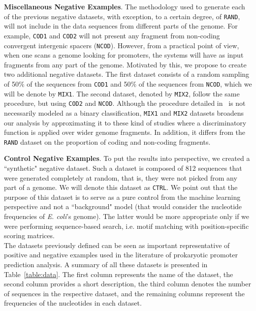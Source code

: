 \documentclass[conference]{IEEEtran}
\begin{document}
\noindent
{\bf Miscellaneous Negative Examples}. The methodology used to generate each of the previous negative datasets, with exception, to a certain degree, of {\tt RAND}, will not include in the data sequences from different parts of the genome. For example, {\tt COD1} and {\tt COD2} will not present any fragment from  non-coding convergent intergenic spacers ({\tt NCOD}). However, from a practical point of view, when one scans a genome looking for promoters, the systems will have as input fragments from any part of the genome. Motivated by this, we propose to create two additional negative datasets. The first dataset consists of a random sampling of 50\% of the sequences from {\tt COD1} and 50\% of the sequences from {\tt NCOD}, which we will be denote by {\tt MIX1}. The second dataset, denoted by {\tt MIX2}, follow the same procedure, but using {\tt COD2} and {\tt NCOD}. Although the procedure detailed in~\cite{hutchinson1996} is not necessarily modeled as a binary classification, {\tt MIX1} and {\tt MIX2} datasets broadens our analysis by approximating it to these kind of studies where a discriminatory function is applied over wider genome fragments. In addition, it differs from the {\tt RAND} dataset on the proportion of coding and non-coding fragments.

\noindent
{\bf Control Negative Examples}. To put the results into perspective, we created a ``synthetic" negative dataset. Such a dataset is composed of  812 sequences that were generated completely at random, that is, they were not picked from any part of a genome. We will denote this dataset as {\tt CTRL}. We point out that the purpose of this dataset is to serve as a pure control from the machine learning perspective and not a ``background" model (that would consider the nucleotide frequencies of {\it E. coli}'s genome). The latter would be more appropriate only if we were performing sequence-based search, i.e. motif matching with position-specific scoring matrices.\\

The datasets previously defined can be seen as important representative of positive and negative examples used in the literature of prokaryotic promoter prediction analysis. A summary of all these datasets is presented in Table~\ref{table:data}. The first column represents the name of the dataset, the second column provides a short description, the third column denotes the number of sequences in the respective dataset, and the remaining columns represent the frequencies of the nucleotides in each dataset. 
\end{document}
